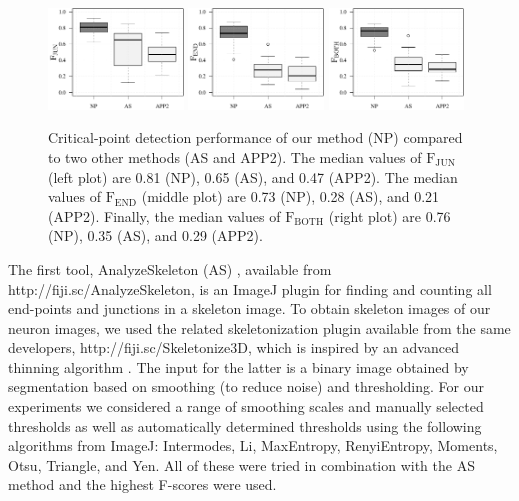 \begin{figure}
	\includegraphics[width=0.32\textwidth]{compareJUN_all}%
	\includegraphics[width=0.32\textwidth]{compareEND_all}%
	\includegraphics[width=0.32\textwidth]{compareBOTH_all}
	\caption{Critical-point detection performance of our method (NP) compared to two other methods (AS and APP2). The median values of $\textrm{F}_{\textrm{JUN}}$ (left plot) are 0.81 (NP), 0.65 (AS), and 0.47 (APP2). The median values of $\textrm{F}_{\textrm{END}}$ (middle plot) are 0.73 (NP), 0.28 (AS), and 0.21 (APP2). Finally, the median values of $\textrm{F}_{\textrm{BOTH}}$ (right plot) are 0.76 (NP), 0.35 (AS), and 0.29 (APP2).}
	\label{fig:comparison-all}
\end{figure}

The first tool, AnalyzeSkeleton (AS) \cite{arganda20103d}, available from http://fiji.sc/AnalyzeSkeleton, is an ImageJ plugin for finding and counting all end-points and junctions in a skeleton image. To obtain skeleton images of our neuron images, we used the related skeletonization plugin available from the same developers, http://fiji.sc/Skele\-tonize3D, which is inspired by an advanced thinning algorithm \cite{lee1994building}. The input for the latter is a binary image obtained by segmentation based on smoothing (to reduce noise) and thresholding. For our experiments we considered a range of smoothing scales and manually selected thresholds as well as automatically determined thresholds using the following algorithms from ImageJ: Intermodes, Li, MaxEntropy, RenyiEntropy, Moments, Otsu, Triangle, and Yen. All of these were tried in combination with the AS method and the highest F-scores were used.

